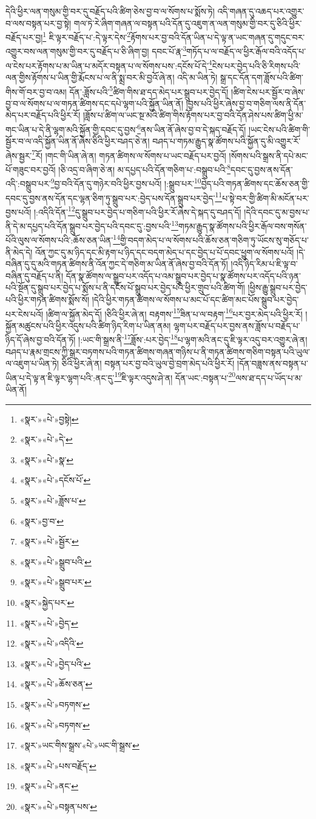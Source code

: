 དེའི་ཕྱིར་ལན་གསུམ་གྱི་བར་དུ་བརྗོད་པའི་ཚིག་ཅེས་བྱ་བ་ལ་སོགས་པ་སྨོས་ཏེ། འདི་གཞན་དུ་འཆད་པར་འགྱུར་བ་ལས་བསྟན་པར་བྱ་སྟེ། གལ་ཏེ་རེ་ཞིག་གཞན་ལ་བསྟན་པའི་དོན་དུ་འཇུག་ན་ལན་གསུམ་གྱི་བར་དུ་ཅིའི་ཕྱིར་བརྗོད་པར་བྱ།\footnote{«སྣར་»«པེ་»བྱསྟེ།} ཇི་ལྟར་བརྗོད་པ་:དེ་ལྟར་དེས་\footnote{«སྣར་»«པེ་»དེ་}རྟོགས་པར་བྱ་བའི་དོན་ཡིན་པ་དེ་ལྟ་ན་ཡང་གཞན་དུ་གདུང་བར་འགྱུར་བས་ལན་གསུམ་གྱི་བར་དུ་བརྗོད་པ་ཅི་ཞིག་བྱ། དབང་པོ་རྣ་\footnote{«སྣར་»«པེ་»སྣ་}གཏོད་པ་ལ་བརྗོད་ལ་ཕྱིར་རྒོལ་བའི་འདོད་པ་ལ་ངེས་པར་རྟོགས་པ་མ་ཡིན་པ་མདོར་བསྟན་པ་ལ་སོགས་པས་:དངོས་པོ་དེ་\footnote{«སྣར་»«པེ་»དངོས་པོ་}ངེས་པར་བྱེད་པའི་ཅི་རིགས་པའི་ལན་གྱིས་རྟོགས་པ་ཡིན་གྱི་རྨོངས་པ་ལ་ནི་སྨྲ་བར་མི་བྱའོ་ཞེ་ན། འདི་མ་ཡིན་ཏེ། སྒྲ་དང་དོན་དག་ཟློས་པའི་ཚིག་གིས་གོ་བར་བྱ་བ་འམ། དོན་:ཟློས་པའི་\footnote{«སྣར་»«པེ་»ཟློས་པ་}ཚིག་གིས་ཐ་དད་མེད་པར་སྒྲུབ་པར་བྱེད་དོ། །ཚིག་ངེས་པར་སྦྱོར་བ་ཞེས་བྱ་བ་ལ་སོགས་པ་ལ་གཏན་ཚིགས་དང་དཔེ་ལྷག་པའི་སྐྱོན་ཡིན་ནོ། །བྱས་པའི་ཕྱིར་ཞེས་བྱ་བ་གཅིག་ལས་ནི་དོན་མེད་པར་བརྗོད་པའི་ཕྱིར་རོ། །ཟློས་པ་ཚིག་ལ་ཡང་སྔ་མའི་ཚིག་གིས་རྟོགས་པར་བྱ་བའི་དོན་ཤེས་པས་ཚིག་ཕྱི་མ་གང་ཡིན་པ་དེ་ནི་ལྷག་མའི་སྐྱོན་གྱི་དབང་དུ་བྱས་\footnote{«སྣར་»བྱ་བ་}ནས་ཡིན་ནོ་ཞེས་བྱ་བ་དེ་སྐད་བརྗོད་དོ། །ཡང་ངེས་པའི་ཚིག་གི་སྦྱོར་བ་ལ་འདི་སྐྱོན་ཡིན་ནོ་ཞེས་ཅིའི་ཕྱིར་བཤད་ཅེ་ན། བཤད་པ་གཏམ་རྒྱུད་སྣ་ཚོགས་པའི་སྐྱོན་དུ་མི་འགྱུར་རོ་ཞེས་སྦྱར་\footnote{«སྣར་»«པེ་»སྦྱོར་}རོ། །གང་གི་ཡིན་ཞེ་ན། གཏན་ཚིགས་ལ་སོགས་པ་ཡང་བརྗོད་པར་བྱའོ། །སོགས་པའི་སྒྲས་ནི་དཔེ་མང་པོ་གཟུང་བར་བྱའོ། །ཅི་འདྲ་བ་ཞིག་ཅེ་ན། མ་དཔྱད་པའི་དོན་གཅིག་པ་:བསྒྲུབ་པའི་\footnote{«སྣར་»«པེ་»སྒྲུབ་པའི་}དབང་དུ་བྱས་ནས་དོན་འདི་:བསྒྲུབ་པར་\footnote{«སྣར་»«པེ་»སྒྲུབ་པར་}བྱ་བའི་དོན་དུ་གཉེར་བའི་ཕྱིར་བྱས་པའོ། །:སྒྲུབ་པར་\footnote{«སྣར་»སྐྱེད་པར་}བྱེད་པའི་གཏན་ཚིགས་དང་ཆོས་ཅན་གྱི་དབང་དུ་བྱས་ནས་དོན་དང་ལྷན་ཅིག་ཏུ་སྒྲུབ་པར་:བྱེད་པས་དོན་སྒྲུབ་པར་བྱེད་\footnote{«སྣར་»«པེ་»བྱེད་}པ་སྟེ་བར་གྱི་ཚིག་མི་མངོན་པར་བྱས་པའོ། །:འདིའི་དོན་\footnote{«སྣར་»«པེ་»འདིའི་}དུ་སྒྲུབ་པར་བྱེད་པ་གཅིག་པའི་ཕྱིར་རོ་ཞེས་དེ་སྐད་དུ་བཤད་དོ། །དེའི་དབང་དུ་མ་བྱས་པ་ནི་དེ་མ་དཔྱད་པའི་དོན་སྒྲུབ་པར་བྱེད་པའི་དབང་དུ་:བྱས་པའི་\footnote{«སྣར་»«པེ་»བྱེད་པའི་}གཏམ་རྒྱུད་སྣ་ཚོགས་པའི་ཕྱིར་རྒོལ་བས་གསོན་པོའི་ལུས་ལ་སོགས་པའི་:ཆོས་ཅན་ཡིན་\footnote{«སྣར་»«པེ་»ཆོས་ཅན་}གྱི་བདག་མེད་པ་ལ་སོགས་པའི་ཆོས་ཅན་གཅིག་ཏུ་ཡོངས་སུ་གཅོད་པ་ནི་མེད་དེ། འོན་ཀྱང་དུ་མ་ཉིད་དང་མི་རྟག་པ་ཉིད་དང་བདག་མེད་པ་དང་བྱེད་པ་པོ་དབང་ཕྱུག་ལ་སོགས་པའོ། །དེ་བཞིན་དུ་དུ་མའི་གཏན་ཚིགས་ནི་འོན་ཀྱང་དེ་གཅིག་མ་ཡིན་ནོ་ཞེས་བྱ་བའི་དོན་ཏོ། །འདི་ཉིད་རིམ་པ་ཇི་ལྟ་བ་བཞིན་དུ་བརྗོད་པ་ནི། དོན་སྣ་ཚོགས་ལ་སྒྲུབ་པར་འདོད་པ་འམ་སྒྲུབ་པར་བྱེད་པ་སྣ་ཚོགས་པར་འདོད་པའི་ཉན་པའི་སྔོན་དུ་སྒྲུབ་པར་བྱེད་པ་སྨོས་པ་ནི་དངོས་པོ་སྒྲུབ་པར་བྱེད་པའི་ཕྱིར་གྲུབ་པའི་ཚིག་གོ། །ཕྱིས་རྒྱུ་སྒྲུབ་པར་བྱེད་པའི་ཕྱིར་གཏན་ཚིགས་སྨོས་སོ། །དེའི་ཕྱིར་གཏན་ཚིགས་ལ་སོགས་པ་མང་པོ་དང་ཚིག་མང་པོས་སྒྲུབ་པར་བྱེད་པར་ངེས་པའོ། །ཚིག་ལ་སྐྱོན་མེད་དོ། །ཅིའི་ཕྱིར་ཞེ་ན། བརྟགས་\footnote{«སྣར་»«པེ་»བཏགས་}ཟིན་པ་ལ་བརྟག་\footnote{«སྣར་»«པེ་»བཏགས་}པར་བྱར་མེད་པའི་ཕྱིར་རོ། །སྐྱོན་མཚུངས་པའི་ཕྱིར་འདུས་པའི་ཚིག་ཉིད་རིག་པ་ཡིན་ནམ། ལྷག་པར་བརྗོད་པར་བྱས་ནས་ཟློས་པ་བརྗོད་པ་ཉིད་དོ་ཞེས་བྱ་བའི་དོན་ཏོ། །:ཡང་གི་སྒྲས་ནི་\footnote{«སྣར་»ཡང་གིས་སྒྲས་«པེ་»ཡང་གི་སྒྲས་}ཟློས་:པར་བྱེད་\footnote{«སྣར་»«པེ་»པས་བརྗོད་}པ་ལྷག་མའི་ནང་དུ་ཇི་ལྟར་འདུ་བར་འགྱུར་ཞེ་ན། བཤད་པ་རྣམ་གྲངས་ཀྱི་སྒྲར་བཏགས་པའི་གཏན་ཚིགས་གཞན་གཉིས་པ་ནི་གཏན་ཚིགས་གཅིག་བསྟན་པའི་ཡུལ་ལ་འཇུག་པ་ཡིན་ཏེ། ཅིའི་ཕྱིར་ཞེ་ན། བསྟན་པར་བྱ་བའི་ཡུལ་བྱེ་བྲག་མེད་པའི་ཕྱིར་རོ། །དོན་བཟླས་ནས་བསྟན་པ་ཡིན་པ་དེ་ལྟ་ན་ཇི་ལྟར་ལྷག་པའི་:ནང་དུ་\footnote{«སྣར་»«པེ་»ནང་}ཇི་ལྟར་འདུས་ཤེ་ན། དོན་ཡང་:བསྟན་པ་\footnote{«སྣར་»«པེ་»བསྟན་པས་}ལས་ཐ་དད་པ་ཡོད་པ་མ་ཡིན་ནོ། 